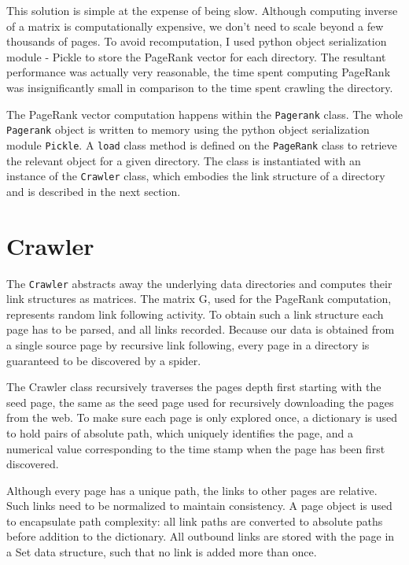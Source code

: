 \documentclass[12pt,notitlepage,twoside]{scrreprt}
\begin{document}
This solution is simple at the expense of being slow. Although computing
inverse of a matrix is computationally expensive, we don't need to scale beyond
a few thousands of pages.  To avoid recomputation, I used python object
serialization module - Pickle to store the PageRank vector for each directory.
The resultant performance was actually very reasonable, the time spent
computing PageRank was insignificantly small in comparison to the time spent
crawling the directory.

The PageRank vector computation happens within the \texttt{Pagerank} class. The
whole \texttt{Pagerank} object is written to memory using the python object
serialization module \texttt{Pickle}. A \texttt{load} class method is defined
on the \texttt{PageRank} class to retrieve the relevant object for a given
directory. The class is instantiated with an instance of the \texttt{Crawler}
class, which embodies the link structure of a directory and is described in the
next section.

\section{Crawler} 

The \texttt{Crawler} abstracts away the underlying data directories and
computes their link structures as matrices.  The matrix G, used for the
PageRank computation, represents random link following activity.  To obtain
such a link structure each page has to be parsed, and all links recorded.
Because our data is obtained from a single source page by recursive link
following, every page in a directory is guaranteed to be discovered by a
spider.

The Crawler class recursively traverses the pages depth first starting with the
seed page, the same as the seed page used for recursively downloading the pages
from the web. To make sure each page is only explored once, a dictionary is
used to hold pairs of absolute path, which uniquely identifies the page, and a
numerical value corresponding to the time stamp when the page has been first
discovered.

Although every page has a unique path, the links to other pages are relative.
Such links need to be normalized to maintain consistency.  A page object is
used to encapsulate path complexity: all link paths are converted to absolute
paths before addition to the dictionary.  All outbound links are stored with
the page in a Set data structure, such that no link is added more than once. 
\end{document}
